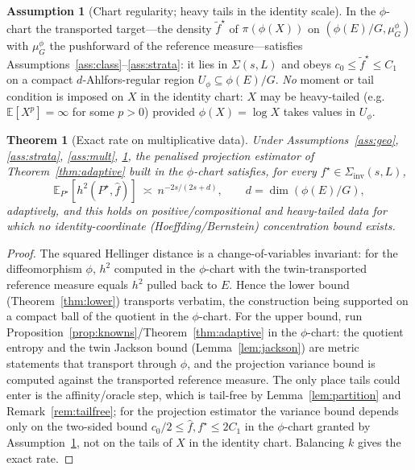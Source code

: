 \documentclass[11pt]{article}
\theoremstyle{plain}
\newtheorem{theorem}{Theorem}[section]
\theoremstyle{definition}
\newtheorem{assumption}{Assumption}
\theoremstyle{remark}
\newcommand{\E}{\mathbb{E}}
\newcommand{\Siv}{\Sigma_{\mathrm{inv}}}
\DeclareMathOperator{\dimm}{dim}
\begin{document}
\begin{assumption}[Chart regularity; heavy tails in the identity scale]\label{ass:phichart}
In the $\phi$-chart the transported target---the density $\tilde f^\star$ of
$\pi(\phi(X))$ on $(\phi(E)/G,\mu_G^\phi)$ with $\mu_G^\phi$ the pushforward of the
reference measure---satisfies Assumptions~\ref{ass:class}--\ref{ass:strata}: it
lies in $\Sigma(s,L)$ and obeys $c_0\le\tilde f^\star\le C_1$ on a compact
$d$-Ahlfors-regular region $U_\phi\subseteq\phi(E)/G$. \emph{No} moment or tail
condition is imposed on $X$ in the identity chart: $X$ may be heavy-tailed
(e.g.\ $\E[X^p]=\infty$ for some $p>0$) provided $\phi(X)=\log X$ takes values in
$U_\phi$.
\end{assumption}

\begin{theorem}[Exact rate on multiplicative data]\label{thm:mult}
Under Assumptions~\ref{ass:geo}, \ref{ass:strata}, \ref{ass:mult}, \ref{ass:phichart},
the penalised projection estimator of Theorem~\ref{thm:adaptive} built in the
$\phi$-chart satisfies, for every $f^\star\in\Siv(s,L)$,
\[
\E_{P^\star}[h^2(P^\star,\widehat f)]\ \asymp\ n^{-2s/(2s+d)},\qquad d=\dimm(\phi(E)/G),
\]
adaptively, and this holds on positive/compositional and heavy-tailed data for
which no identity-coordinate (Hoeffding/Bernstein) concentration bound exists.
\end{theorem}

\begin{proof}
The squared Hellinger distance is a change-of-variables invariant: for the
diffeomorphism $\phi$, $h^2$ computed in the $\phi$-chart with the
twin-transported reference measure equals $h^2$ pulled back to $E$. Hence the lower
bound (Theorem~\ref{thm:lower}) transports verbatim, the construction being
supported on a compact ball of the quotient in the $\phi$-chart. For the upper
bound, run Proposition~\ref{prop:knowns}/Theorem~\ref{thm:adaptive} in the
$\phi$-chart: the quotient entropy and the twin Jackson bound
(Lemma~\ref{lem:jackson}) are metric statements that transport through $\phi$, and
the projection variance bound is computed against the transported reference
measure. The only place tails could enter is the affinity/oracle step, which is
tail-free by Lemma~\ref{lem:partition} and Remark~\ref{rem:tailfree}; for the
projection estimator the variance bound depends only on the two-sided bound
$c_0/2\le\widehat f,f^\star\le2C_1$ in the $\phi$-chart granted by
Assumption~\ref{ass:phichart}, not on the tails of $X$ in the identity chart.
Balancing $k$ gives the exact rate.
\end{proof}
\end{document}
